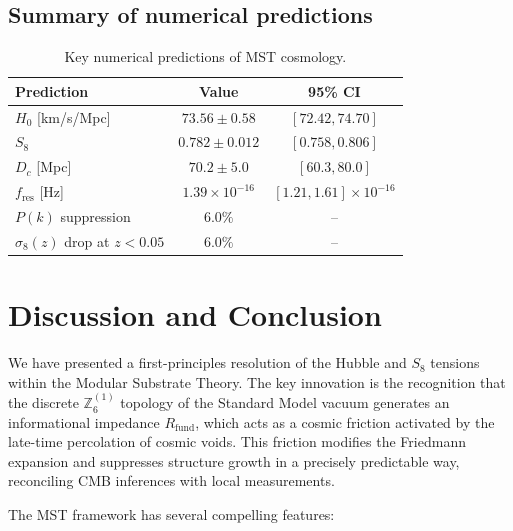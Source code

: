 \documentclass[12pt,a4paper]{article}
\theoremstyle{plain}
\theoremstyle{definition}
\theoremstyle{remark}
\begin{document}
\subsection{Summary of numerical predictions}
\begin{table}[H]
\centering
\caption{Key numerical predictions of MST cosmology.}
\label{tab:predictions}
\begin{tabular}{lcc}
\toprule
Prediction & Value & 95\% CI \\
\midrule
\(H_0\) [km/s/Mpc] & \(73.56 \pm 0.58\) & \([72.42, 74.70]\) \\
\(S_8\) & \(0.782 \pm 0.012\) & \([0.758, 0.806]\) \\
\(D_c\) [Mpc] & \(70.2 \pm 5.0\) & \([60.3, 80.0]\) \\
\(f_{\text{res}}\) [Hz] & \(1.39\times 10^{-16}\) & \([1.21, 1.61]\times 10^{-16}\) \\
\(P(k)\) suppression & \(6.0\%\) & -- \\
\(\sigma_8(z)\) drop at \(z<0.05\) & \(6.0\%\) & -- \\
\bottomrule
\end{tabular}
\end{table}

\section{Discussion and Conclusion}
\label{sec:conclusion}

We have presented a first-principles resolution of the Hubble and \(S_8\) tensions within the Modular Substrate Theory. The key innovation is the recognition that the discrete \(\mathbb{Z}_6^{(1)}\) topology of the Standard Model vacuum generates an informational impedance \(R_{\text{fund}}\), which acts as a cosmic friction activated by the late-time percolation of cosmic voids. This friction modifies the Friedmann expansion and suppresses structure growth in a precisely predictable way, reconciling CMB inferences with local measurements.

The MST framework has several compelling features:
\end{document}
